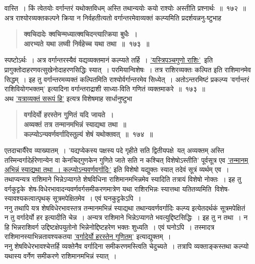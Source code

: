 \documentclass[11pt, openany]{book}
\begin{document}
\newpage

\begin{sloppypar}
\noindent वास्ति~। किं त्वेतयोः वर्गान्तरं यथोक्तविधम् अस्ति तथान्ययोः कयो राश्योः अस्तीति प्रश्नार्थः~॥~१७२~॥\\

{\small अत्र राश्योरव्यक्तकल्पने क्रिया न निर्वहतीत्यतो वर्गान्तरमेवाव्यक्तं कल्प्यमिति प्रदर्शयन्ननु-ष्टुभाह\textendash }

 \label{10.173}
\begin{quote}
{\large \textbf{{\color{purple}क्वचिदादेः क्वचिन्मध्यात्क्वचिदन्त्यात्क्रिया बुधैः~।\\
आरभ्यते यथा लघ्वी निर्वहेच्च यथा तथा~॥~१७३~॥}}}
\end{quote}

स्पष्टोऽर्थः~। अत्र वर्गान्तरस्यैवं यद्यव्यक्तमानं कल्प्यते तर्हि~। \hyperref[10.170]{'यस्त्रिपञ्चगुणो राशिः'}~इति प्रागुक्तोदाहरणवत्सुखेनोदाहरणसिद्धिः स्यात्~। परमियान्विशेषः~। तत्र राशिरव्यक्तः कल्पित इति राशिमानमेव सिद्धम्~। इह तु वर्गान्तरमव्यक्तं कल्पितमिति राश्योर्वर्गान्तरमेव सिध्येत्~। अतोऽन्तरमिष्टं प्रकल्प्य {\color{violet}'वर्गान्तरं राशिवियोगभक्तम्'} इत्यादिना वर्गान्तराद्राशी साध्या-विति गणितं व्यक्तमाकरे~॥~१७३~॥\\

{\small अथ \hyperref[10.169]{'यत्राव्यक्तं सरूपं हि'} इत्यत्र विशेषमाह सार्धानुष्टुभा\textendash }

 \label{10.174}
\begin{quote}
{\large \textbf{{\color{purple}वर्गादेर्यो हरस्तेन गुणितं यदि जायते~।\\
अव्यक्तं तत्र तन्मानमभिन्नं स्याद्यथा तथा~॥\\
कल्प्योऽन्यवर्णवर्गादिस्तुल्यं शेषं यथोक्तवत्~॥~१७४~॥}}}
\end{quote}

एतदाचार्यैरेव व्याख्यातम्~। 'यद्यप्येकस्य पक्षस्य पदे गृहीते सति द्वितीयपक्षे~यत् अव्यक्तम् अस्ति तस्मिन्वर्गादेर्हरेणान्येन वा केनचिद्गुणकेन गुणिते जाते सति न कश्चित् विशेषोऽस्तीति' पूर्वसूत्र एव \hyperref[10.174]{'तन्मानम् अभिन्नं स्याद्यथा तथा~। कल्प्योऽन्यवर्णवर्गादिः'} इति विशेषो यद्युक्तः स्यात् तदेवं सूत्रं व्यर्थम् एव~। तथाप्यन्यत्र राशिमाने भिन्नेऽप्यागते शेषविधिना राशिमानमभिन्नमेव स्यादिति तत्रायं विशेषो नोक्तः~। इह तु वर्गकुट्टके~शेष-विधेरभावादन्यवर्णवर्गसमीकरणमात्रेण यथा राशिरभिन्नः स्यात्तथा यतितव्यमिति~विशेष-स्यावश्यकत्वात्पृथक् सूत्रमपेक्षितमेव~। एवं घनकुट्टकेऽपि~।\\

ननु तथापि यत्र शेषविधेरभावस्तत्र तन्मानमभिन्नं स्याद्यथा तथान्यवर्णवर्गादिः कल्प्य इत्येतदर्थकं सूत्रमपेक्षितं न तु वर्गादेर्यो हर इत्यादीति चेन्न~। अन्यत्र राशिमाने भिन्नेऽप्यागते भवत्युद्दिष्टसिद्धिः~। इह तु न तथा~। न हि भिन्नराशिवर्ग उद्दिष्टक्षेपयुतोनो भिन्नेनोद्दिष्टहरेण भक्तः शुध्यति~। एवं घनोऽपि~। तस्मादत्र राशिमानस्याभिन्नतावश्यकतया \hyperref[10.174]{'वर्गादेर्यो हरस्तेन गुणितम्'} इत्याद्युक्तम्~।\\

ननु शेषविधेरभावश्चेत्तर्हि व्यक्तेनैव वर्गादिना समीकरणमस्त्विति चेदुच्यते~। तत्रापि व्यक्ताङ्कस्तथा कल्प्यो यथास्य वर्गेण समीकरणे राशिमानमभिन्नं स्यात्~।
\end{sloppypar}
\end{document}

